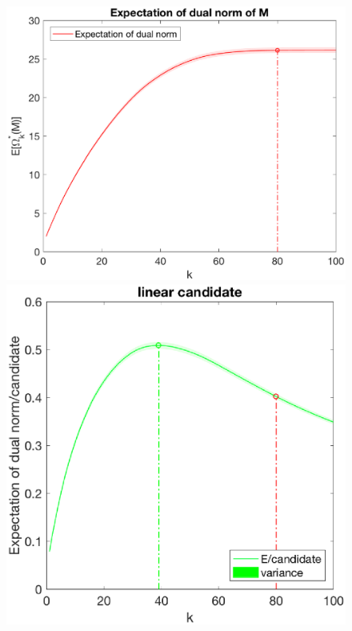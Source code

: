 \documentclass[12pt]{article}
\begin{document}
\begin{figure}[h]
    \begin{minipage}[c]{.3\linewidth}
        \centering
        \includegraphics[width=\linewidth]{Fig/dualnorm-u0rand-k0-80.eps}
    \end{minipage}
    \hfill%
    \begin{minipage}[c]{.3\linewidth}
        \centering
        \includegraphics[width=\linewidth]{Fig/dualnorm-u0rand-k0-80-candidatelin.eps}

\end{minipage}
\end{figure}
\end{document}
